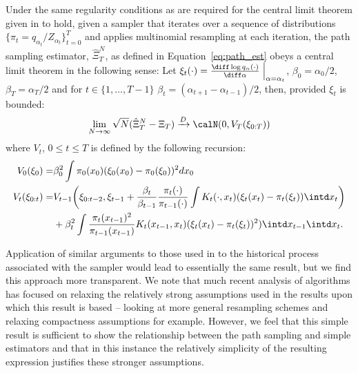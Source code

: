 \begin{proposition}\label{prop:path_clt}
  Under the same regularity conditions as are required for the central limit
  theorem given in \cite{DelMoral:2006hc} to hold, given a \smc sampler that
  iterates over a sequence of distributions $\{\pi_t =
  q_{\alpha_t}/Z_{\alpha_t}\}_{t=0}^T$ and applies multinomial resampling at
  each iteration, the path sampling estimator, $\hat\Xi_{T}^{N}$, as
  defined in Equation~\eqref{eq:path_est} obeys a central limit theorem in the
  following sense: Let $\xi_t(\cdot) = \rnd{\log
    q_{\alpha}(\cdot)}{\alpha}\Bigm|_{\alpha = \alpha_t}$, $\beta_{0} =
  \alpha_0 / 2$, $\beta_{T} = \alpha_T / 2$ and for $t \in \{1,\ldots,T-1\}$
  $\beta_t = (\alpha_{t + 1} - \alpha_{t-1})/2$, then, provided $\xi_t$ is
  bounded:
  \begin{equation}
    \lim_{N\to\infty}\sqrt{N}(\hat\Xi_{T}^{N} - \Xi_T)
    \xrightarrow{D}\calN(0, V_T(\xi_{0:T}))
  \end{equation}
  where $V_t$, $0\le t \le T$ is defined by the following recursion:
  \begin{align}
    V_0(\xi_0) =&  \beta_0^2
    \int \pi_0(x_0) (\xi_0(x_0)
    - \pi_0(\xi_0))^2 dx_0 \\
    V_t(\xi_{0:t}) =& V_{t-1}\biggl(\xi_{0:t-2}, \xi_{t-1}
    + \frac{\beta_t}{\beta_{t-1}}
    \frac{\pi_{t}(\cdot)}{\pi_{t-1}(\cdot)}
    \int K_t(\cdot,x_t) (\xi_t(x_t)-\pi_t(\xi_t)) \intd x_t
    \biggr) \\\notag
    &+ \beta_t^2 \int\frac{\pi_t(x_{t-1})^2}{\pi_{t-1}(x_{t-1})}
    K_t(x_{t-1},x_t)(\xi_t(x_t) - \pi_t(\xi_t))^2) \intd x_{t-1} \intd x_t.
  \end{align}


\end{proposition}

Application of similar arguments to those used in \cite{DelMoral:2006hc} to
the historical process associated with the \smc sampler would lead to
essentially the same result, but we find this approach more transparent.  We
note that much recent analysis of \smc algorithms has focused on relaxing the
relatively strong assumptions used in the results upon which this result is
based -- looking at more general resampling schemes \cite{DelMoral:2012jq}
and relaxing compactness assumptions \cite{Whiteley:2013} for example.
However, we feel that this simple result is sufficient to show the
relationship between the path sampling and simple estimators and that in this
instance the relatively simplicity of the resulting expression justifies these
stronger assumptions.

